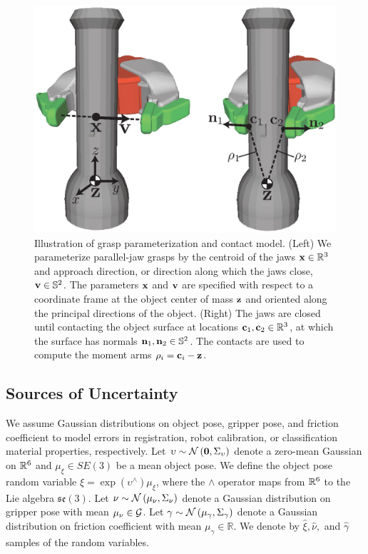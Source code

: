 \begin{figure}[t!]
\centering
\includegraphics[scale=0.44]{figures/illustrations/dexnet_grasping_model.eps}
\caption{Illustration of grasp parameterization and contact model. (Left) We parameterize parallel-jaw grasps by the centroid of the jaws $\mathbf{x} \in \mathbb{R}^3$ and approach direction, or direction along which the jaws close, $\mathbf{v} \in \mathbb{S}^2$. The parameters $\mathbf{x}$ and $\mathbf{v}$ are specified with respect to a coordinate frame at the object center of mass $\mathbf{z}$ and oriented along the principal directions of the object. (Right) The jaws are closed until contacting the object surface at locations $\mathbf{c}_1, \mathbf{c}_2 \in \mathbb{R}^3$, at which the surface has normals $\mathbf{n}_1, \mathbf{n}_2 \in \mathbb{S}^2$. The contacts are used to compute the moment arms $\rho_i = \mathbf{c}_i - \mathbf{z}$.
}
\vspace*{-15pt}
\end{figure}

\subsection{Sources of Uncertainty}
We assume Gaussian distributions on object pose, gripper pose, and friction coefficient to model errors in registration, robot calibration, or classification material properties, respectively.  
Let $\upsilon \sim \mathcal{N}\left(\mathbf{0}, \Sigma_{\upsilon}\right)$ denote a zero-mean Gaussian on $\mathbb{R}^6$ and $\mu_{\xi} \in SE(3)$ be a mean object pose.
We define the object pose random variable $\xi = \exp\left( \upsilon^{\wedge} \right) \mu_{\xi}$, where the $\wedge$ operator maps from $\mathbb{R}^6$ to the Lie algebra $\mathfrak{se}(3)$.
Let $\nu \sim \mathcal{N}\left(\mu_{\nu}, \Sigma_{\nu}\right)$ denote a Gaussian distribution on gripper pose with mean $\mu_{\nu} \in \mathcal{G}$.
Let $\gamma \sim \mathcal{N}\left(\mu_{\gamma}, \Sigma_{\gamma} \right)$ denote a Gaussian distribution on friction coefficient with mean $\mu_{\gamma} \in \mathbb{R}$.
We denote by $\hat{\xi}, \hat{\nu},$ and $\hat{\gamma}$ samples of the random variables. 

